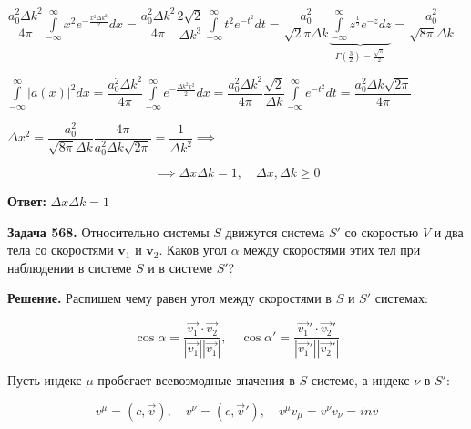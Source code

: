 \documentclass[a4paper,12pt]{article}
\begin{document}
	\begin{center}
		$\dfrac{a_0^2 \Delta k^2}{4\pi} \displaystyle\int\limits_{-\infty}^{\infty} x^2 e^{-\frac{x^2 \Delta k^2}{2}} dx = \dfrac{a_0^2 \Delta k^2}{4\pi} \dfrac{2\sqrt{2}}{\Delta k^3} \displaystyle\int\limits_{-\infty}^{\infty} t^2 e^{-t^2} dt = \dfrac{a_0^2 }{\sqrt{2} \pi \Delta k} \underbrace{\displaystyle\int\limits_{-\infty}^{\infty} z^{\frac{1}{2}} e^{-z} dz}_{\Gamma\left(\frac{3}{2}\right) = \frac{\sqrt\pi}{2}} = \dfrac{a_0^2}{\sqrt{8\pi}\Delta k}$
	
		$\displaystyle\int\limits_{-\infty}^{\infty} \left|a(x)\right|^2 dx = \dfrac{a_0^2 \Delta k^2 }{4\pi} \displaystyle\int\limits_{-\infty}^{\infty} e^{-\frac{\Delta k^2 x^2}{2}} dx = \dfrac{a_0^2 \Delta k^2 }{4\pi} \dfrac{\sqrt{2}}{\Delta k} \displaystyle\int\limits_{-\infty}^{\infty} e^{-t^2} dt = \dfrac{a_0^2 \Delta k \sqrt{2\pi}}{4\pi} $  
		
		$\Delta x^2 = \dfrac{a_0^2}{\sqrt{8\pi}\Delta k} \dfrac{4\pi}{a_0^2 \Delta k \sqrt{2\pi}} = \dfrac{1}{\Delta k^2} \implies$
	\end{center}
	
	\begin{equation}
		\implies \Delta x \Delta k = 1, \quad \Delta x, \Delta k \geq 0
	\end{equation}
	
	\quad \textbf{Ответ:} $\Delta x \Delta k = 1$
	
	\quad \textbf{Задача 568.} Относительно системы $S$ движутся система $S'$ со скоростью $V$ и два тела со скоростями $\mathbf{v}_1$ и $\mathbf{v}_2$. Каков угол $\alpha$ между скоростями этих тел при наблюдении в системе $S$ и в системе $S'$?
	
	\quad \textbf{Решение.} Распишем чему равен угол между скоростями в $S$ и $S'$ системах:
	
	\begin{equation}
		\cos\alpha = \dfrac{\vec{v_1} \cdot \vec{v_2}}{|\vec{v_1}||\vec{v_1}|}, \quad \cos\alpha' = \dfrac{\vec{v_1}' \cdot \vec{v_2}'}{|\vec{v_1}'| |\vec{v_2}'|}
	\end{equation}
	
	\quad Пусть индекс $\mu$ пробегает всевозмодные значения в $S$ системе, а индекс $\nu$ в $S'$:
	
	\begin{equation}
		v^\mu = \left(c, \vec{v}\right), \quad v^{\nu} = \left(c, \vec{v}'\right), \quad v^\mu v_\mu = v^\nu v_\nu = inv
	\end{equation}
	
\end{document}

